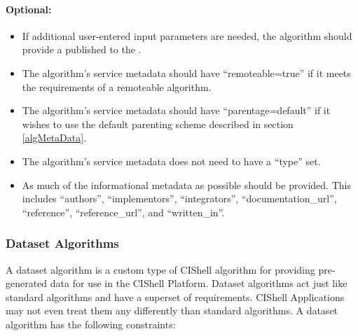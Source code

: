 \paragraph*{Optional:}
\begin{itemize}
  \item If additional user-entered input parameters are needed, the algorithm
  should provide a  published to the .
  \item The algorithm's service metadata should have ``remoteable=true'' if it
  meets the requirements of a remoteable algorithm.
  \item The algorithm's service metadata should have ``parentage=default'' if
  it wishes to use the default  parenting scheme described in
  section \ref{algMetaData}.
  \item The algorithm's service metadata does not need to have a ``type'' set.
  \item As much of the informational metadata as possible should be
  provided. This includes ``authors'', ``implementors'', ``integrators'',
  ``documentation\_url'', ``reference'', ``reference\_url'', and ``written\_in''.
\end{itemize}

\subsubsection{Dataset Algorithms}

A dataset algorithm is a custom type of CIShell algorithm for providing
pre-generated data for use in the CIShell Platform. Dataset algorithms act just
like standard algorithms and have a superset of requirements. CIShell
Applications may not even treat them any differently than standard algorithms. A
dataset algorithm has the following constraints:

